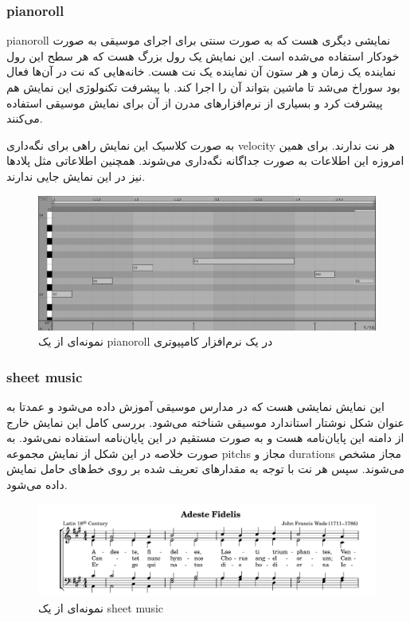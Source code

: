 \subsubsection{\gls{pianoroll}}
\gls{pianoroll} نمایشی دیگری هست که به صورت سنتی برای اجرای موسیقی به صورت
خودکار استفاده می‌شده است. این نمایش یک رول بزرگ هست که هر سطح این رول نماینده
یک زمان و هر ستون آن نماینده یک نت هست. خانه‌هایی که نت در آن‌ها فعال بود سوراخ
می‌شد تا ماشین بتواند آن را اجرا کند. با پیشرفت تکنولوژی این نمایش هم پیشرفت کرد
و بسیاری از نرم‌افزارهای مدرن از آن برای نمایش موسیقی استفاده می‌کنند.

به صورت کلاسیک این نمایش راهی برای نگه‌داری \gls{velocity} هر نت ندارند. برای
همین امروزه این اطلاعات به صورت جداگانه نگه‌داری می‌شوند. همچنین اطلاعاتی مثل
پلادها نیز در این نمایش جایی ندارند.
\begin{figure}
    \centering
    \includegraphics[width=12cm]{./statics/midi_piano_roll.png}
    \caption{نمونه‌ای از یک \gls{pianoroll} در یک نرم‌افزار کامپیوتری}
\end{figure}

\subsubsection{\gls{sheet music}}
این نمایش نمایشی هست که در مدارس موسیقی آموزش داده می‌شود و عمدتا به عنوان شکل
نوشتار استاندارد موسیقی شناخته می‌شود. بررسی کامل این نمایش خارج از دامنه‌ این
پایان‌نامه هست و به صورت مستقیم در این پایان‌نامه استفاده نمی‌شود. به صورت خلاصه
در این شکل از نمایش مجموعه \glspl{pitch}‌ مجاز و \glspl{duration}‌ مجاز مشخص
می‌شوند. سپس هر نت با توجه به مقدارهای تعریف شده بر روی خط‌های حامل نمایش داده
می‌شود.
\begin{figure}
    \centering
    \includegraphics[width=12cm]{./statics/sheet_music.png}
    \caption{نمونه‌ای از یک \gls{sheet music}}
\end{figure}

